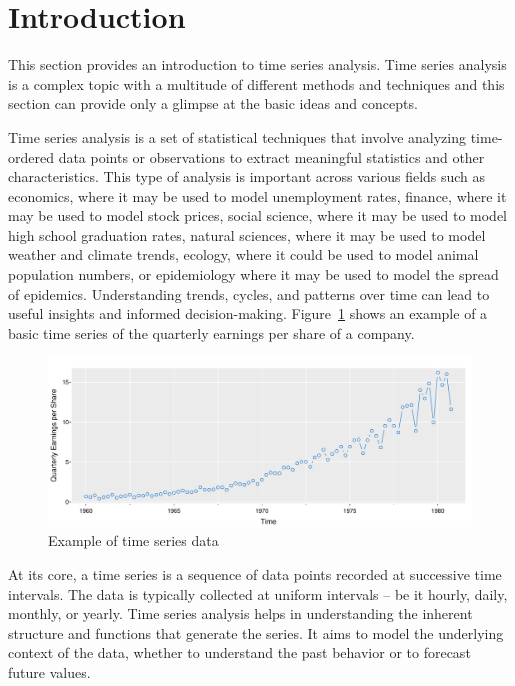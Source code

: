 \section{Introduction}

This section provides an introduction to time series analysis. Time series analysis is a complex topic with a multitude of different methods and techniques and this section can provide only a glimpse at the basic ideas and concepts. 

Time series analysis is a set of statistical techniques that involve analyzing time-ordered data points or observations to extract meaningful statistics and other characteristics. This type of analysis is important across various fields such as economics, where it may be used to model unemployment rates, finance, where it may be used to model stock prices, social science, where it may be used to model high school graduation rates, natural sciences, where it may be used to model weather and climate trends, ecology, where it could be used to model animal population numbers, or epidemiology where it may be used to model the spread of epidemics. Understanding trends, cycles, and patterns over time can lead to useful insights and informed decision-making. Figure~\ref{fig:figure1} shows an example of a basic time series of the quarterly earnings per share of a company.

\begin{figure}[b]
\centering

\includegraphics[width=.9\textwidth]{figure1.pdf}
\caption{Example of time series data}
\label{fig:figure1}
\end{figure}

At its core, a time series is a sequence of data points recorded at successive time intervals. The data is typically collected at uniform intervals -- be it hourly, daily, monthly, or yearly. Time series analysis helps in understanding the inherent structure and functions that generate the series. It aims to model the underlying context of the data, whether to understand the past behavior or to forecast future values.

